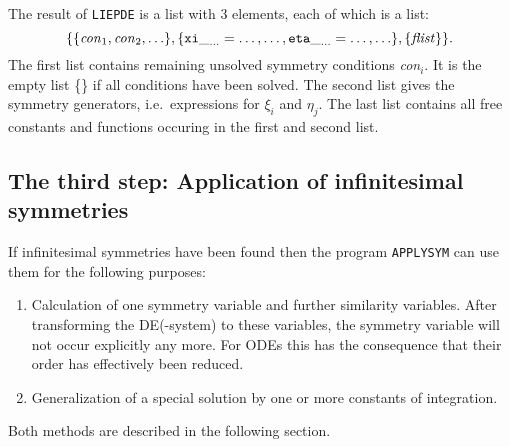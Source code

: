 The result of {\tt LIEPDE} is a list with 3 elements, each of which
is a list:
\[ \{\{{\it con}_1,{\it con}_2,\ldots\},
     \{{\tt xi}\__{\ldots}=\ldots, \ldots,
       {\tt eta}\__{\ldots}=\ldots, \ldots\},
     \{{\it flist}\}\}. \]
The first list contains remaining unsolved symmetry conditions {\it con}$_i$. It
is the empty list \{\} if all conditions have been solved. The second list
gives the symmetry generators, i.e.\ expressions for $\xi_i$ and $\eta_j$. The
last list contains all free constants and functions occuring in the first
and second list.

%
%
\subsection{The third step: Application of infinitesimal symmetries}
If infinitesimal symmetries have been found then
the program {\tt APPLYSYM} can use them for the following purposes:
\begin{enumerate}
\item Calculation of one symmetry variable and further similarity variables.
After transforming
the DE(-system) to these variables, the symmetry variable will not occur
explicitly any more. For ODEs this has the consequence that their order has
effectively been reduced.
\item Generalization of a special solution by one or more constants of
integration.
\end{enumerate}
Both methods are described in the following section.
